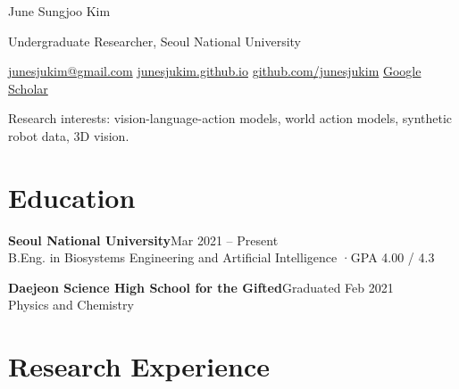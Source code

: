 \documentclass[10pt,a4paper]{article}
\newcommand{\entry}[3]{%
  {\textbf{#1}\hfill{\color{muted}\small #2}}\\
  {\color{muted}#3}\par}
\newcommand{\sep}{\enspace{\color{rule}|}\enspace}
\begin{document}
\fontsize{10pt}{12.4pt}\selectfont
\raggedright

{\rmfamily\fontsize{26}{28}\selectfont June Sungjoo Kim}\par\vspace{3pt}
{\color{muted}Undergraduate Researcher, Seoul National University}\par\vspace{3pt}
{\small
\href{mailto:junesjukim@gmail.com}{junesjukim@gmail.com}\sep
\href{https://junesjukim.github.io}{junesjukim.github.io}\sep
\href{https://github.com/junesjukim}{github.com/junesjukim}\sep
\href{https://scholar.google.com/citations?user=qc6CJjYAAAAJ}{Google Scholar}}

\vspace{4pt}
{\small\color{muted}Research interests: vision-language-action models, world action models, synthetic robot data, 3D vision.}

\section{Education}

\entry{Seoul National University}{Mar 2021 -- Present}
      {B.Eng. in Biosystems Engineering and Artificial Intelligence \enspace·\enspace GPA 4.00 / 4.3}
\vspace{3pt}
\entry{Daejeon Science High School for the Gifted}{Graduated Feb 2021}
      {Physics and Chemistry}

\section{Research Experience}
\end{document}
